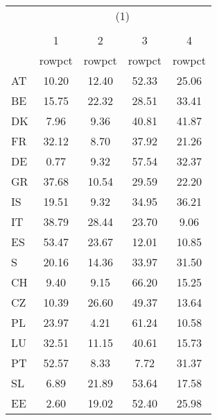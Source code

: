 {
\def\sym#1{\ifmmode^{#1}\else\(^{#1}\)\fi}
\begin{tabular}{l*{4}{c}}
\hline\hline
            &\multicolumn{4}{c}{(1)}                            \\
            &\multicolumn{4}{c}{}                               \\
            &           1&           2&           3&           4\\
            &      rowpct&      rowpct&      rowpct&      rowpct\\
\hline
AT          &       10.20&       12.40&       52.33&       25.06\\
BE          &       15.75&       22.32&       28.51&       33.41\\
DK          &        7.96&        9.36&       40.81&       41.87\\
FR          &       32.12&        8.70&       37.92&       21.26\\
DE          &        0.77&        9.32&       57.54&       32.37\\
GR          &       37.68&       10.54&       29.59&       22.20\\
IS          &       19.51&        9.32&       34.95&       36.21\\
IT          &       38.79&       28.44&       23.70&        9.06\\
ES          &       53.47&       23.67&       12.01&       10.85\\
S           &       20.16&       14.36&       33.97&       31.50\\
CH          &        9.40&        9.15&       66.20&       15.25\\
CZ          &       10.39&       26.60&       49.37&       13.64\\
PL          &       23.97&        4.21&       61.24&       10.58\\
LU          &       32.51&       11.15&       40.61&       15.73\\
PT          &       52.57&        8.33&        7.72&       31.37\\
SL          &        6.89&       21.89&       53.64&       17.58\\
EE          &        2.60&       19.02&       52.40&       25.98\\
\hline\hline
\end{tabular}
}
